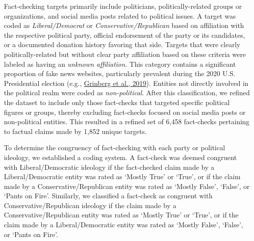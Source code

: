 \documentclass[
  12pt,
]{article}
\begin{document}
Fact-checking targets primarily include politicians, politically-related
groups or organizations, and social media posts related to political
issues. A target was coded as \emph{Liberal/Democrat} or
\emph{Conservative/Republican} based on affiliation with the respective
political party, official endorsement of the party or its candidates, or
a documented donation history favoring that side. Targets that were
clearly politically-related but without clear party affiliation based on
these criteria were labeled as having an \emph{unknown affiliation.}
This category contains a significant proportion of fake news websites,
particularly prevalent during the 2020 U.S. Presidential election (e.g.,
\protect\hyperlink{ref-grinberg2019fake}{Grinberg et al., 2019}).
Entities not directly involved in the political realm were coded as
\emph{non-political}. After this classification, we refined the dataset
to include only those fact-checks that targeted specific political
figures or groups, thereby excluding fact-checks focused on social media
posts or non-political entities. This resulted in a refined set of 6,458
fact-checks pertaining to factual claims made by 1,852 unique targets.

To determine the congruency of fact-checking with each party or
political ideology, we established a coding system. A fact-check was
deemed congruent with Liberal/Democratic ideology if the fact-checked
claim made by a Liberal/Democratic entity was rated as `Mostly True' or
`True', or if the claim made by a Conservative/Republican entity was
rated as `Mostly False', `False', or `Pants on Fire'. Similarly, we
classified a fact-check as congruent with Conservative/Republican
ideology if the claim made by a Conservative/Republican entity was rated
as `Mostly True' or `True', or if the claim made by a Liberal/Democratic
entity was rated as `Mostly False', `False', or `Pants on Fire'.
\end{document}

